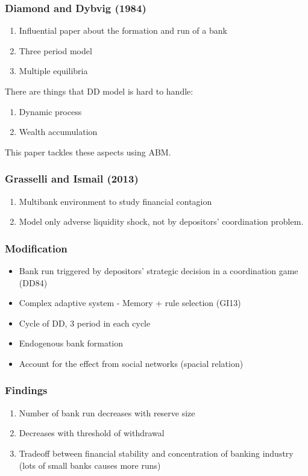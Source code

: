 \begin{frame}
    \frametitle{Diamond and Dybvig (1984)}

    \begin{enumerate}
        \item Influential paper about the formation and run of a bank
        \item Three period model
        \item Multiple equilibria 
    \end{enumerate}

    There are things that DD model is hard to handle:

    \begin{enumerate}
        \item Dynamic process
        \item Wealth accumulation
    \end{enumerate}

    This paper tackles these aspects using ABM.
\end{frame}

\begin{frame}
    \frametitle{Grasselli and Ismail (2013)}

    \begin{enumerate}
        \item Multibank environment to study financial contagion
        \item Model only adverse liquidity shock, not by depositors' coordination problem.
    \end{enumerate}
    

\end{frame}

\begin{frame}
    \frametitle{Modification}

    \begin{itemize}
        \item Bank run triggered by depositors' strategic decision in a coordination game (DD84)
        \item Complex adaptive system - Memory + rule selection (GI13)
        \item Cycle of DD, 3 period in each cycle
        \item Endogenous bank formation
        \item Account for the effect from social networks (spacial relation)
    \end{itemize}

\end{frame}

\begin{frame}
    \frametitle{Findings}
    \begin{enumerate}
        \item Number of bank run decreases with reserve size
        \item Decreases with threshold of withdrawal 
        \item Tradeoff between financial stability and concentration of banking industry (lots of small banks causes more runs)
    \end{enumerate}

\end{frame}
